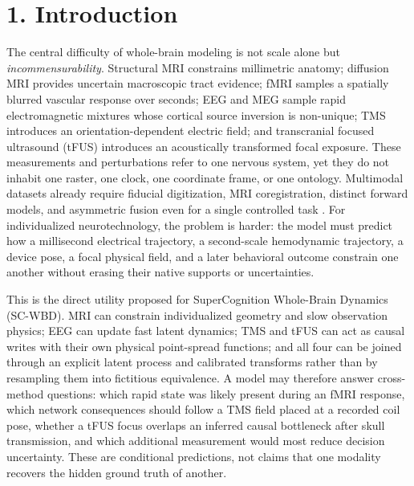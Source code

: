 \section{1. Introduction}

The central difficulty of whole-brain modeling is not scale alone but
\emph{incommensurability}. Structural MRI constrains millimetric anatomy;
diffusion MRI provides uncertain macroscopic tract evidence; fMRI samples a
spatially blurred vascular response over seconds; EEG and MEG sample rapid
electromagnetic mixtures whose cortical source inversion is non-unique; TMS
introduces an orientation-dependent electric field; and transcranial focused
ultrasound (tFUS) introduces an acoustically transformed focal exposure.
These measurements and perturbations refer to one nervous system, yet they do
not inhabit one raster, one clock, one coordinate frame, or one ontology.
Multimodal datasets already require fiducial digitization, MRI
coregistration, distinct forward models, and asymmetric fusion even for a
single controlled task \citep{henson2019}. For individualized
neurotechnology, the problem is harder: the model must predict how a
millisecond electrical trajectory, a second-scale hemodynamic trajectory, a
device pose, a focal physical field, and a later behavioral outcome constrain
one another without erasing their native supports or uncertainties.

This is the direct utility proposed for SuperCognition Whole-Brain Dynamics
(SC-WBD). MRI can constrain individualized geometry and slow observation
physics; EEG can update fast latent dynamics; TMS and tFUS can act as causal
writes with their own physical point-spread functions; and all four can be
joined through an explicit latent process and calibrated transforms rather
than by resampling them into fictitious equivalence. A model may therefore
answer cross-method questions: which rapid state was likely present during an
fMRI response, which network consequences should follow a TMS field placed at
a recorded coil pose, whether a tFUS focus overlaps an inferred causal
bottleneck after skull transmission, and which additional measurement would
most reduce decision uncertainty. These are conditional predictions, not
claims that one modality recovers the hidden ground truth of another.

